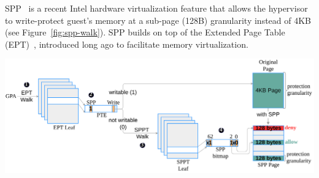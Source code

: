 \documentclass[landscape,a0paper,fontscale=0.3]{baposter} %
\begin{document}
\begin{poster}
{ %
    SPP~\cite{spp} is a recent Intel hardware virtualization feature that allows the hypervisor to write-protect guest’s memory at a sub-page (128B) granularity instead of 4KB (see Figure~\ref{fig:spp-walk}). SPP builds on top of the Extended Page Table (EPT)~\cite{ept}, introduced long ago to facilitate memory virtualization. 

    \begin{minipage}[t]{\linewidth}
        \centering
        \includegraphics[width=.75\columnwidth]{figures/spp_walk}
        \vspace*{-2mm}
        \label{fig:spp-walk}      
    \end{minipage}    
}


\end{poster}
\end{document}
